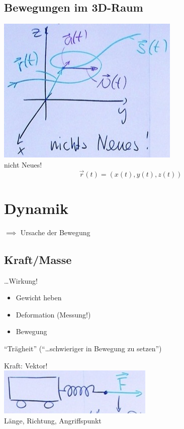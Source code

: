 \subsection{Bewegungen im 3D-Raum}
\includegraphics{Bild18} \\
nicht Neues!
\[ \vec{r}(t) = ( x(t) , y(t) , z(t) ) \]

\section{Dynamik}
$\implies$ Ursache der Bewegung
\subsection{Kraft/Masse}
\begin{def*}[ note = Kraft , index = Kraft ]
	\dots Wirkung!
\end{def*}
\begin{bsp*}
	\begin{itemize}
		\item Gewicht heben
		\item Deformation (Messung!)
		\item Bewegung
	\end{itemize}
\end{bsp*}
\begin{def*}[ note = Masse , index = Masse ]
	\enquote{Trägheit} (\enquote{\dots schwieriger in Bewegung zu setzen})
\end{def*}
Kraft: Vektor! \\
\includegraphics{Bild19} \\
Länge, Richtung, Angriffspunkt

